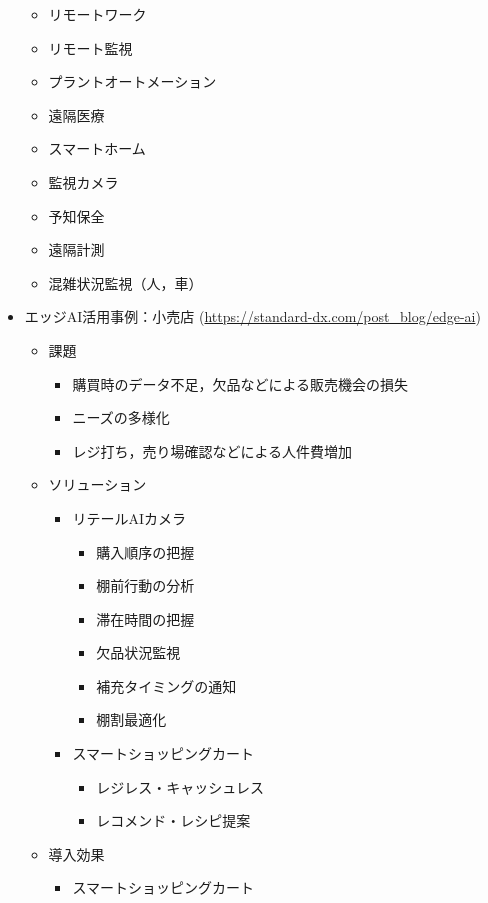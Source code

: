 \begin{itemize}
	\begin{itemize}
		\item リモートワーク
		\item リモート監視
		\item プラントオートメーション
		\item 遠隔医療
		\item スマートホーム
		\item 監視カメラ
		\item 予知保全
		\item 遠隔計測
		\item 混雑状況監視（人，車）
	\end{itemize}
	\item エッジAI活用事例：小売店 (\url{https://standard-dx.com/post_blog/edge-ai})
	\begin{itemize}
		\item 課題
		\begin{itemize}
			\item 購買時のデータ不足，欠品などによる販売機会の損失
			\item ニーズの多様化
			\item レジ打ち，売り場確認などによる人件費増加
		\end{itemize}
		\item ソリューション
		\begin{itemize}
			\item リテールAIカメラ
			\begin{itemize}
				\item 購入順序の把握
				\item 棚前行動の分析
				\item 滞在時間の把握
				\item 欠品状況監視
				\item 補充タイミングの通知
				\item 棚割最適化
			\end{itemize}
			\item スマートショッピングカート
			\begin{itemize}
				\item レジレス・キャッシュレス
				\item レコメンド・レシピ提案
			\end{itemize}
		\end{itemize}
		\item 導入効果
		\begin{itemize}
			\item スマートショッピングカート
			\begin{itemize}

\end{itemize}
\end{itemize}
\end{itemize}
\end{itemize}
